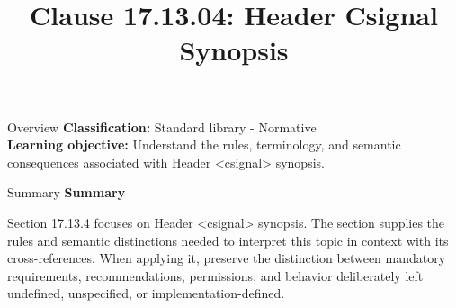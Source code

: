 \documentclass[10pt,letterpaper]{article}
\title{Clause 17.13.04: Header Csignal Synopsis}
\author{}
\date{}
\begin{document}
\maketitle
\begin{CornellOverviewBox}{Overview}
\textbf{Classification:} Standard library - Normative\\[2pt]
\textbf{Learning objective:} Understand the rules, terminology, and semantic consequences associated with Header <csignal> synopsis.
\end{CornellOverviewBox}\begin{CornellSummaryBox}{Summary}
{\sffamily\bfseries\color{Accent} Summary}\par\vspace{3pt}Section 17.13.4 focuses on Header <csignal> synopsis. The section supplies the rules and semantic distinctions needed to interpret this topic in context with its cross-references. When applying it, preserve the distinction between mandatory requirements, recommendations, permissions, and behavior deliberately left undefined, unspecified, or implementation-defined.
\end{CornellSummaryBox}
\end{document}
